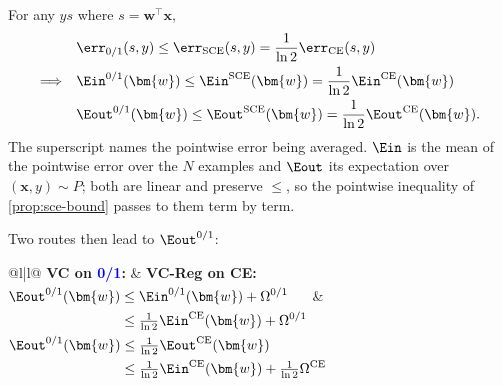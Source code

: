 For any \(ys\) where \(s = \bm{w}^\top \bm{x}\),
\begin{align*}
    &\err_{0/1}(s, y) \le \err_{\mathrm{SCE}}(s, y) = \frac{1}{\ln 2}
    \err_{\mathrm{CE}}(s, y)\\
    \Longrightarrow \quad
    &\Ein^{0/1}(\bm{w}) \le \Ein^{\mathrm{SCE}}(\bm{w}) = \frac{1}{\ln 2}
    \Ein^{\mathrm{CE}}(\bm{w})\\
    &\Eout^{0/1}(\bm{w}) \le \Eout^{\mathrm{SCE}}(\bm{w}) = \frac{1}{\ln 2}
    \Eout^{\mathrm{CE}}(\bm{w}) .
\end{align*}
The superscript names the pointwise error being averaged. \(\Ein\) is the mean
of the pointwise error over the \(N\) examples and \(\Eout\) its expectation
over \((\bm{x}, y) \sim P\); both are linear and preserve \(\le\), so the
pointwise inequality of \autoref{prop:sce-bound} passes to them term by term.

Two routes then lead to \(\Eout^{0/1}\):

\begin{center}
    \begin{adjustbox}{max width=\textwidth}
        \solidrules
        \begin{tabular}{@{}l|l@{}}
            \toprule
            \textbf{VC on \textcolor{blue}{0/1}:}
            & \textbf{VC-Reg on CE:}\\
            \midrule
            \(\begin{aligned}[t]
                \rule{0pt}{3ex}\Eout^{0/1}(\bm{w})
                &\le \Ein^{0/1}(\bm{w}) + \Omega^{0/1}\\
                &\le \tfrac{1}{\ln 2} \Ein^{\mathrm{CE}}(\bm{w}) +
                \Omega^{0/1}
            \end{aligned}\)
            & \(\begin{aligned}[t]
                \rule{0pt}{3ex}\Eout^{0/1}(\bm{w})
                &\le \tfrac{1}{\ln 2} \Eout^{\mathrm{CE}}(\bm{w})\\
                &\le \tfrac{1}{\ln 2} \Ein^{\mathrm{CE}}(\bm{w}) +
                \tfrac{1}{\ln 2} \Omega^{\mathrm{CE}}
            \end{aligned}\)\\[4pt]
            \bottomrule
        \end{tabular}
    \end{adjustbox}
\end{center}

